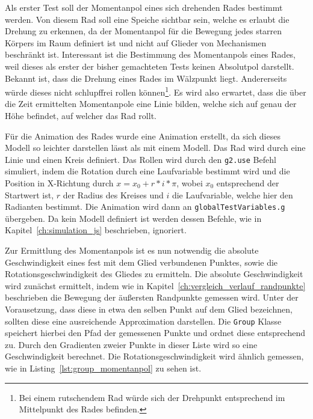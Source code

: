 Als erster Test soll der Momentanpol eines sich drehenden Rades bestimmt werden.
Von diesem Rad soll eine Speiche sichtbar sein, welche es erlaubt die Drehung zu erkennen, da der Momentanpol für die Bewegung jedes starren Körpers im Raum definiert ist und nicht auf Glieder von Mechanismen beschränkt ist.
Interessant ist die Bestimmung des Momentanpols eines Rades, weil dieses als erster der bisher gemachteten Tests keinen Absolutpol darstellt.
Bekannt ist, dass die Drehung eines Rades im Wälzpunkt liegt.
Andererseits würde dieses nicht schlupffrei rollen können\footnote{Bei einem rutschendem Rad würde sich der Drehpunkt entsprechend im Mittelpunkt des Rades befinden.}.
Es wird also erwartet, dass die über die Zeit ermittelten Momentanpole eine Linie bilden, welche sich auf genau der Höhe befindet, auf welcher das Rad rollt.

Für die Animation des Rades wurde eine  Animation erstellt,
da sich dieses Modell so leichter darstellen lässt als mit einem  Modell.
Das Rad wird durch eine Linie und einen Kreis definiert.
Das Rollen wird durch den \lstinline{g2.use} Befehl simuliert, indem die Rotation durch eine Laufvariable bestimmt wird und die Position in X-Richtung durch $x = x_0 + r * i * \pi$, wobei $x_0$ entsprechend der Startwert ist, $r$ der Radius des Kreises und $i$ die Laufvariable, welche hier den Radianten bestimmt.
Die Animation wird dann an \lstinline{globalTestVariables.g} übergeben.
Da kein  Modell definiert ist werden dessen Befehle, wie in Kapitel~\ref{ch:simulation_js} beschrieben, ignoriert.

Zur Ermittlung des Momentanpols ist es nun notwendig die absolute Geschwindigkeit eines fest mit dem Glied verbundenen Punktes, sowie die Rotationsgeschwindigkeit des Gliedes zu ermitteln.
Die absolute Geschwindigkeit wird zunächst ermittelt, indem wie in Kapitel~\ref{ch:vergleich_verlauf_randpunkte} beschrieben die Bewegung der äußersten Randpunkte gemessen wird.
Unter der Vorausetzung, dass diese in etwa den selben Punkt auf dem Glied bezeichnen, sollten diese eine ausreichende Approximation darstellen.
Die \lstinline{Group} Klasse speichert hierbei den Pfad der gemessenen Punkte und ordnet diese entsprechend zu.
Durch den Gradienten zweier Punkte in dieser Liste wird so eine Geschwindigkeit berechnet.
Die Rotationsgeschwindigkeit wird ähnlich gemessen, wie in Listing~\ref{lst:group_momentanpol} zu sehen ist.

